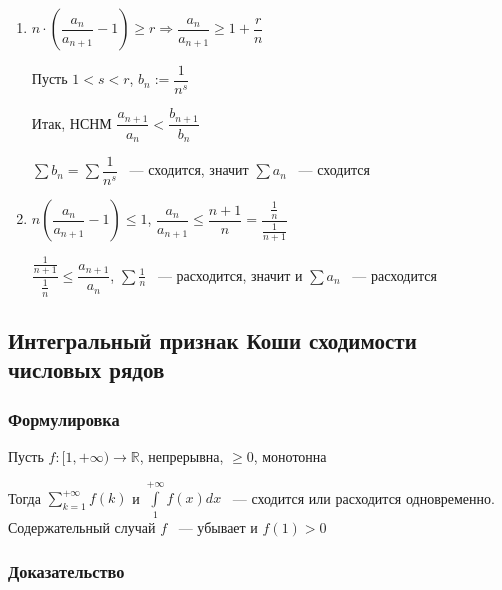 \documentclass[../main.tex]{subfiles}
\begin{document}
                \begin{enumerate}
                
                    \item $n \cdot \left( \dfrac{a_n}{a_{n + 1}} - 1 \right) \geq r \Rightarrow \dfrac{a_n}{a_{n + 1}} \geq 1 + \dfrac{r}{n}$
                    
                    Пусть $1 < s < r$, $b_n := \dfrac{1}{n^s}$
                    
                    Итак, НСНМ $\dfrac{a_{n + 1}}{a_n} < \dfrac{b_{n + 1}}{b_n}$
                    
                    $\sum b_n = \sum \dfrac{1}{n^s}$ ~--- сходится, значит $\sum a_n$ ~--- сходится
                    
                    \item $n \left( \dfrac{a_n}{a_{n + 1}} - 1 \right) \leq 1$, $\dfrac{a_n}{a_{n + 1}} \leq \dfrac{n + 1}{n} = \dfrac{\frac{1}{n}}{\frac{1}{n + 1}}$
                    
                    $\dfrac{\frac{1}{n + 1}}{\frac{1}{n}} \leq \dfrac{a_{n + 1}}{a_n}$, $\sum \frac{1}{n}$ ~--- расходится, значит и $\sum a_n$ ~--- расходится
                    
                \end{enumerate}
                
\newpage


\subsection{Интегральный признак Коши сходимости числовых рядов}
 \subsubsection*{Формулировка}
        
            Пусть $f : [1, +\infty) \rightarrow \mathbb{R}$, непрерывна, $\geq 0$, монотонна
            
            Тогда $\sum\limits^{+\infty}_{k = 1} f(k)$ и $\int\limits^{+\infty}_1 f(x) dx$ ~--- сходится или расходится одновременно. Содержательный случай $f$ ~--- убывает и $f(1) > 0$
            
        \subsubsection*{Доказательство}
        
\end{document}
